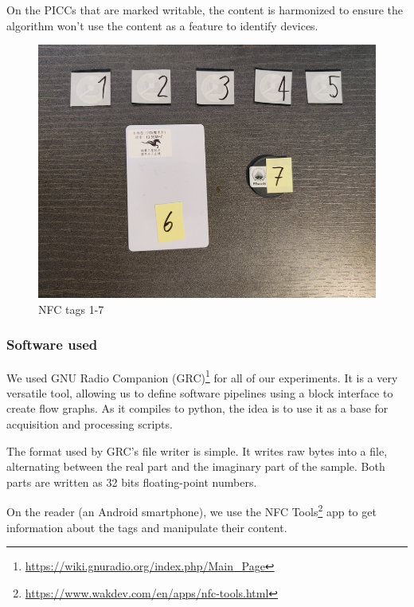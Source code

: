 On the PICCs that are marked writable, the content is harmonized to ensure the algorithm won't use the content as a feature to identify devices.

\begin{figure}[htp!]
  \centering
  \includegraphics[scale=0.35]{figures/data_standard-tags2.jpg}
  \caption{NFC tags 1-7}
  \label{fig:tags}
\end{figure}

\subsubsection{Software used}

We used GNU Radio Companion (GRC)\footnote{\url{https://wiki.gnuradio.org/index.php/Main_Page}} for all of our experiments. It is a very versatile tool, allowing us to define software pipelines using a block interface to create flow graphs. As it compiles to python, the idea is to use it as a base for acquisition and processing scripts.

The format used by GRC's file writer is simple. It writes raw bytes into a file, alternating between the real part and the imaginary part of the sample. Both parts are written as 32 bits floating-point numbers.

On the reader (an Android smartphone), we use the NFC Tools\footnote{\url{https://www.wakdev.com/en/apps/nfc-tools.html}} app to get information about the tags and manipulate their content.

